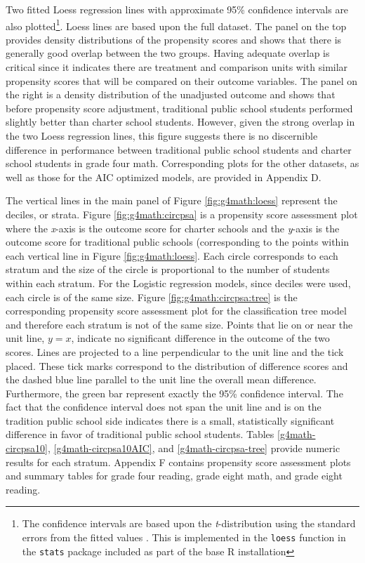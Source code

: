 \documentclass[letterpaper,12p,twoside]{article} %
\begin{document}
Two fitted Loess regression lines with approximate 95\% confidence intervals are also plotted\footnote{The confidence intervals are based upon the \textit{t}-distribution using the standard errors from the fitted values \cite{Cleveland1992}. This is implemented in the \texttt{loess} function in the \texttt{stats} package included as part of the base R \cite{rdevelopment} installation}. Loess lines are based upon the full dataset. The panel on the top provides density distributions of the propensity scores and shows that there is generally good overlap between the two groups. Having adequate overlap is critical since it indicates there are treatment and comparison units with similar propensity scores that will be compared on their outcome variables. The panel on the right is a density distribution of the unadjusted outcome and shows that before propensity score adjustment, traditional public school students performed slightly better than charter school students. However, given the strong overlap in the two Loess regression lines, this figure suggests there is no discernible difference in performance between traditional public school students and charter school students in grade four math. Corresponding plots for the other datasets, as well as those for the AIC optimized models, are provided in Appendix D.

The vertical lines in the main panel of Figure \ref{fig:g4math:loess} represent the deciles, or strata. Figure \ref{fig:g4math:circpsa} is a propensity score assessment plot \cite{HelmreichPruzek2009} where the \textit{x}-axis is the outcome score for charter schools and the \textit{y}-axis is the outcome score for traditional public schools (corresponding to the points within each vertical line in Figure \ref{fig:g4math:loess}. Each circle corresponds to each stratum and the size of the circle is proportional to the number of students within each stratum. For the Logistic regression models, since deciles were used, each circle is of the same size. Figure \ref{fig:g4math:circpsa:tree} is the corresponding propensity score assessment plot for the classification tree model and therefore each stratum is not of the same size. Points that lie on or near the unit line, $y = x$, indicate no significant difference in the outcome of the two scores. Lines are projected to a line perpendicular to the unit line and the tick placed. These tick marks correspond to the distribution of difference scores and the dashed blue line parallel to the unit line the overall mean difference. Furthermore, the green bar represent exactly the 95\% confidence interval. The fact that the confidence interval does not span the unit line and is on the tradition public school side indicates there is a small, statistically significant difference in favor of traditional public school students. Tables \ref{g4math-circpsa10}, \ref{g4math-circpsa10AIC}, and \ref{g4math-circpsa-tree} provide numeric results for each stratum. Appendix F contains propensity score assessment plots and summary tables for grade four reading, grade eight math, and grade eight reading.
\end{document}
